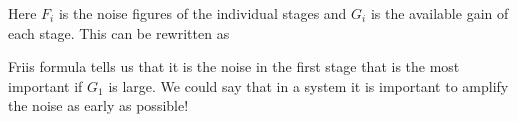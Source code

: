 Here $F_i$ is the noise figures of the individual stages and $G_i$ is
the available gain of each stage. This can be rewritten as 


Friis formula tells us that it is the noise in the first stage that
is the most important if $G_1$ is large. We could say that in a system
it is important to amplify the noise as early as possible!








